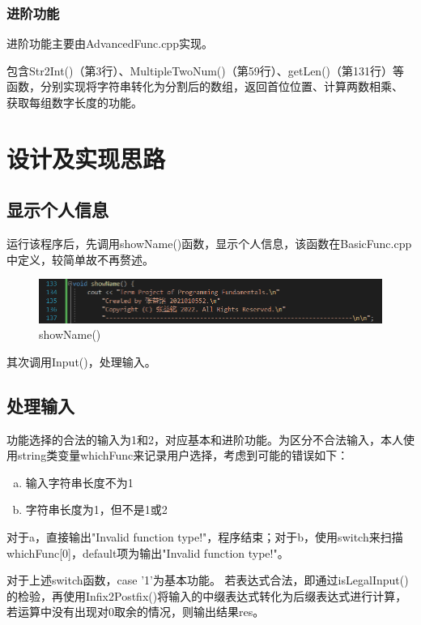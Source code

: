 \documentclass[a4paper, 11pt, UTF8]{ctexart}
\begin{document}
\subsubsection{进阶功能}

进阶功能主要由AdvancedFunc.cpp实现。

包含Str2Int()（第3行）、MultipleTwoNum()（第59行）、getLen()（第131行）等函数，分别实现将字符串转化为分割后的数组，返回首位位置、计算两数相乘、
获取每组数字长度的功能。

\section{设计及实现思路}

\subsection{显示个人信息}

运行该程序后，先调用showName()函数，显示个人信息，该函数在BasicFunc.cpp中定义，较简单故不再赘述。

\begin{figure}[H]
    \centering
    \includegraphics[width=\textwidth]{showname.png}
    \caption{showName()}
\end{figure}

其次调用Input()，处理输入。

\subsection{处理输入}

功能选择的合法的输入为1和2，对应基本和进阶功能。为区分不合法输入，本人使用string类变量whichFunc来记录用户选择，考虑到可能的错误如下：

\begin{enumerate}[a)]
    \item 输入字符串长度不为1
    \item 字符串长度为1，但不是1或2
\end{enumerate}

对于a，直接输出"Invalid function type!"，程序结束；对于b，使用switch来扫描whichFunc[0]，default项为输出"Invalid function type!"。

对于上述switch函数，case '1'为基本功能。
若表达式合法，即通过isLegalInput()的检验，再使用Infix2Postfix()将输入的中缀表达式转化为后缀表达式进行计算，
若运算中没有出现对0取余的情况，则输出结果res。
\end{document}
